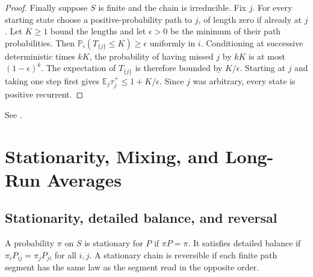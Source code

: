 \documentclass[11pt,oneside,openany]{book}
\theoremstyle{plain}
\theoremstyle{definition}
\theoremstyle{remark}
\begin{document}
\begin{proof}
Finally suppose \(S\) is finite and the chain is irreducible.
Fix \(j\). For every starting state choose a positive-probability
path to \(j\), of length zero if already at \(j\). Let \(K\ge1\)
bound the lengths and let \(\epsilon>0\) be the minimum of their
path probabilities. Then \(\mathbb P_i(T_{\{j\}}\le K)\ge\epsilon\)
uniformly in \(i\). Conditioning at successive deterministic times
\(kK\), the probability of having missed \(j\) by \(kK\) is at
most \((1-\epsilon)^k\). The expectation of \(T_{\{j\}}\) is
therefore bounded by \(K/\epsilon\). Starting at \(j\) and taking
one step first gives \(\mathbb E_j\tau_j^+\le 1+K/\epsilon\).
Since \(j\) was arbitrary, every state is positive recurrent.
\end{proof}

See \cite[Sections 1.2, 1.5 and 1.7--1.8]{Norris}.
\chapter[Stationarity and Mixing]{Stationarity, Mixing, and Long-Run Averages}

\section{Stationarity, detailed balance, and reversal}\label{p207:W13}

A probability \(\pi\) on \(S\) is stationary for \(P\) if
\(\pi P=\pi\). It satisfies detailed balance if
\(\pi_i P_{ij}=\pi_jP_{ji}\) for all \(i,j\).
A stationary chain is reversible if each finite path segment has
the same law as the segment read in the opposite order.
\end{document}
